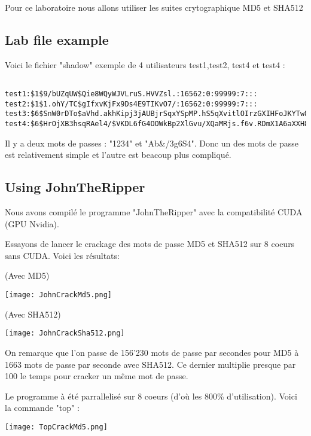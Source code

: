 Pour ce laboratoire nous allons utiliser les suites crytographique MD5 et SHA512

\pagebreak
\subsection{Lab file example}
Voici le fichier "shadow" exemple de 4 utilisateurs test1,test2, test4 et test4 :
\begin{lstlisting}[frame=single,style=Console]  % Start your code-block

test1:$1$9/bUZqUW$Qie8WQyWJVLruS.HVVZsl.:16562:0:99999:7:::
test2:$1$1.ohY/TC$gIfxvKjFx9Ds4E9TIKvO7/:16562:0:99999:7:::
test3:$6$SnW0rDTo$aVhd.akhKipj3jAUBjrSqxYSpMP.hS5qXvitlOIrzGXIHFoJKYTw8YeRRGbh0VJzQYeh2MTwQjJ36BoGs9oyz1:16562:0:99999:7:::
test4:$6$HrOjXB3hsqRAel4/$VKDL6fG4OOWkBp2XlGvu/XQaMRjs.f6v.RDmX1A6aXXH8HYVeOULykT1MNAbvtwl6DAyIQL7AEze2nfX7KyaA0:16562:0:99999:7:::
\end{lstlisting}

Il y a deux mots de passes : "1234" et "Ab&/3g6S4". Donc un des mots de passe est relativement simple et l'autre est beacoup plus compliqué.
 
\subsection{Using JohnTheRipper}
Nous avons compilé le programme "JohnTheRipper" avec la compatibilité CUDA (GPU Nvidia).

Essayons de lancer le crackage des mots de passe MD5 et SHA512 sur 8 coeurs sans CUDA. Voici les résultats:

(Avec MD5)
\begin{center} 
\hspace{15cm}
\texttt{[image: JohnCrackMd5.png]}
\end{center}
\vspace{0.5cm}

(Avec SHA512)
\begin{center} 
\hspace{15cm}
\texttt{[image: JohnCrackSha512.png]}
\end{center}
\vspace{0.5cm}

On remarque que l'on passe de 156'230 mots de passe par secondes pour MD5 à 1663 mots de passe par seconde avec SHA512. Ce dernier multiplie presque par 100 le temps pour cracker un même mot de passe.
\pagebreak
 
Le programme à été parrallelisé sur 8 coeurs (d'où les 800\% d'utilisation). Voici la commande "top" :
\begin{center} 
\hspace{15cm}
\texttt{[image: TopCrackMd5.png]}
\end{center}
\vspace{0.5cm}
 
